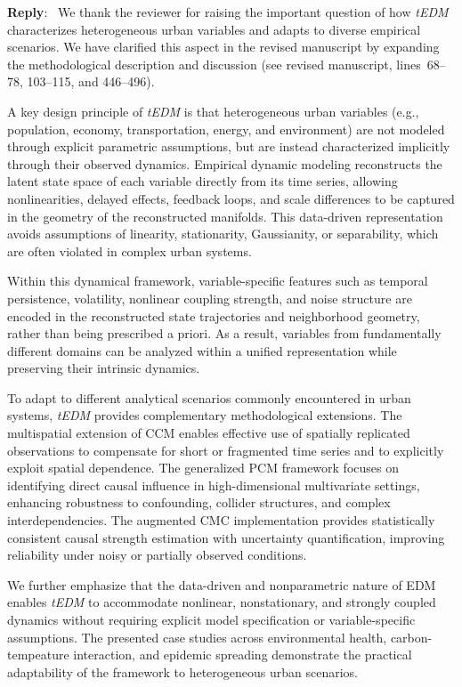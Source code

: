 \documentclass[11pt]{article}
\newcounter{reviewer}
\newenvironment{reply}
   {\medskip \noindent \color{blue} \begin{sf}\textbf{Reply}:\  }
   {\medskip \par \end{sf}}
\begin{document}
\begin{reply}
We thank the reviewer for raising the important question of how \textit{tEDM} characterizes heterogeneous urban variables and adapts to diverse empirical scenarios. We have clarified this aspect in the revised manuscript by expanding the methodological description and discussion (see revised manuscript, lines~68--78, 103--115, and 446--496).

A key design principle of \textit{tEDM} is that heterogeneous urban variables (e.g., population, economy, transportation, energy, and environment) are not modeled through explicit parametric assumptions, but are instead characterized implicitly through their observed dynamics. Empirical dynamic modeling reconstructs the latent state space of each variable directly from its time series, allowing nonlinearities, delayed effects, feedback loops, and scale differences to be captured in the geometry of the reconstructed manifolds. This data-driven representation avoids assumptions of linearity, stationarity, Gaussianity, or separability, which are often violated in complex urban systems.

Within this dynamical framework, variable-specific features such as temporal persistence, volatility, nonlinear coupling strength, and noise structure are encoded in the reconstructed state trajectories and neighborhood geometry, rather than being prescribed a priori. As a result, variables from fundamentally different domains can be analyzed within a unified representation while preserving their intrinsic dynamics.

To adapt to different analytical scenarios commonly encountered in urban systems, \textit{tEDM} provides complementary methodological extensions. The multispatial extension of CCM enables effective use of spatially replicated observations to compensate for short or fragmented time series and to explicitly exploit spatial dependence. The generalized PCM framework focuses on identifying direct causal influence in high-dimensional multivariate settings, enhancing robustness to confounding, collider structures, and complex interdependencies. The augmented CMC implementation provides statistically consistent causal strength estimation with uncertainty quantification, improving reliability under noisy or partially observed conditions.

We further emphasize that the data-driven and nonparametric nature of EDM enables \textit{tEDM} to accommodate nonlinear, nonstationary, and strongly coupled dynamics without requiring explicit model specification or variable-specific assumptions. The presented case studies across environmental health, carbon-tempeature interaction, and epidemic spreading demonstrate the practical adaptability of the framework to heterogeneous urban scenarios.
\end{reply}
\end{document}
